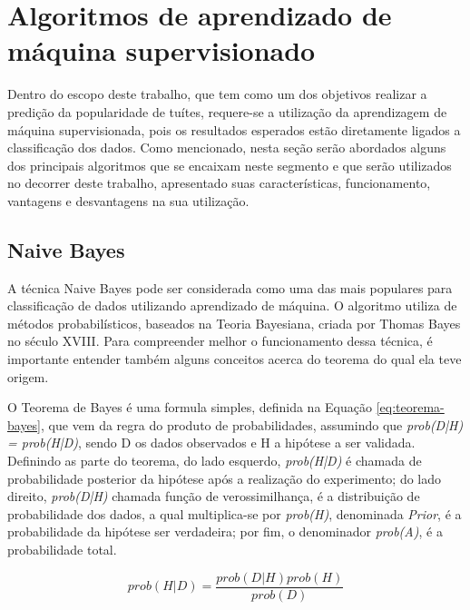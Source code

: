 \documentclass[oneside,openright,12pt]{ufsm_2015} %
\begin{document}
\section{Algoritmos de aprendizado de máquina supervisionado}
\label{sec:alg-aprend-maquina-sup}

\par Dentro do escopo deste trabalho, que tem como um dos objetivos realizar a predição da popularidade de tuítes, requere-se a utilização da aprendizagem de máquina supervisionada, pois os resultados esperados estão diretamente ligados a classificação dos dados. Como mencionado, nesta seção serão abordados alguns dos principais algoritmos que se encaixam neste segmento e que serão utilizados no decorrer deste trabalho, apresentado suas características, funcionamento, vantagens e desvantagens na sua utilização.

\subsection{Naive Bayes}
\label{sec:naive-bayes}

\par A técnica Naive Bayes pode ser considerada como uma das mais populares para classificação de dados utilizando aprendizado de máquina. O algoritmo utiliza de métodos probabilísticos, baseados na Teoria Bayesiana, criada por Thomas Bayes no século XVIII. Para compreender melhor o funcionamento dessa técnica, é importante entender também alguns conceitos acerca do teorema do qual ela teve origem.

\par O Teorema de Bayes é uma formula simples, definida na Equação \ref{eq:teorema-bayes}, que vem da regra do produto de probabilidades, assumindo que \textit{prob(D|H) = prob(H|D)}, sendo D os dados observados e H a hipótese a ser validada. Definindo as parte do teorema, do lado esquerdo, \textit{prob(H|D)} é chamada de probabilidade posterior da hipótese após a realização do experimento; do lado direito, \textit{prob(D|H)} chamada função de verossimilhança, é a distribuição de probabilidade dos dados, a qual multiplica-se por \textit{prob(H)}, denominada \textit{Prior}, é a probabilidade da hipótese ser verdadeira; por fim, o denominador \textit{prob(A)}, é a probabilidade total.
    
\begin{equation} \label{eq:teorema-bayes}
prob(H|D) = \frac{prob(D|H)prob(H)}{prob(D)}
\end{equation}
\end{document}
